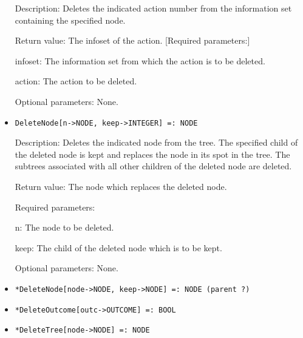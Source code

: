 \begin{itemize}
\bd
\item
[Description:] Deletes the indicated action number from the
information set containing the specified node.
\item
[Return value:] The infoset of the action.  [Required parameters:]\hfil\null
	
\bd
\item
[infoset:] The information set from which the action is to be deleted.
\item [action:] The action to be deleted.
\ed

\item
[Optional parameters:] None.
\ed

\item
\protect \large \begin{verbatim}
DeleteNode[n->NODE, keep->INTEGER] =: NODE
\end{verbatim}\normalsize

\bd
\item   
[Description:] Deletes the indicated node from the tree.  The
specified child of the deleted node is kept and replaces the node in
its spot in the tree.  The subtrees associated with all other children
of the deleted node are deleted.
\item
[Return value:] The node which replaces the deleted node.
\item
[Required parameters:]\hfil\null
	
\bd
\item
[n:] The node to be deleted.
\item
[keep:] The child of the deleted node which is to be kept.
\ed

\item
[Optional parameters:] None.
\ed

\item
\protect \large \begin{verbatim}
*DeleteNode[node->NODE, keep->NODE] =: NODE (parent ?)  
\end{verbatim}\normalsize

\item
\protect \large \begin{verbatim}
*DeleteOutcome[outc->OUTCOME] =: BOOL
\end{verbatim}\normalsize

\item
\protect \large \begin{verbatim}
*DeleteTree[node->NODE] =: NODE
\end{verbatim}\normalsize


\end{itemize}
